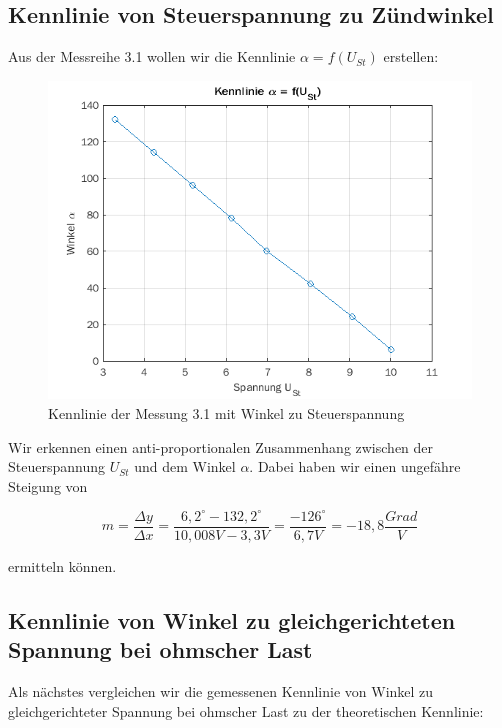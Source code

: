 \documentclass{article}
\begin{document}
\subsection{Kennlinie von Steuerspannung zu Zündwinkel}
\label{sec:kennl-von-steu}

Aus der Messreihe 3.1 wollen wir die Kennlinie $\alpha = f(U_{St})$ erstellen:

\begin{figure}[h]
  \centering
  \includegraphics[width=.75\textwidth]{../assets/images/GEP2/alpha_ust.png}
  \caption{Kennlinie der Messung 3.1 mit Winkel zu Steuerspannung}
  \label{fig:alphaust}
\end{figure}

Wir erkennen einen anti-proportionalen Zusammenhang zwischen der Steuerspannung $U_{St}$ und dem Winkel $\alpha$. Dabei haben wir einen ungefähre Steigung von

\begin{equation*}
  m = \frac{\Delta y}{\Delta x} = \frac{6,2^{\circ} - 132,2^{\circ}}{10,008V - 3,3V} = \frac{-126^{\circ}}{6,7V} = -18,8 \frac{Grad}{V}
\end{equation*}

ermitteln können.

\subsection{Kennlinie von Winkel zu gleichgerichteten Spannung bei ohmscher Last}
\label{sec:kennlinie-von-winkel}

Als nächstes vergleichen wir die gemessenen Kennlinie von Winkel zu gleichgerichteter Spannung bei ohmscher Last zu der theoretischen Kennlinie:
\end{document}
